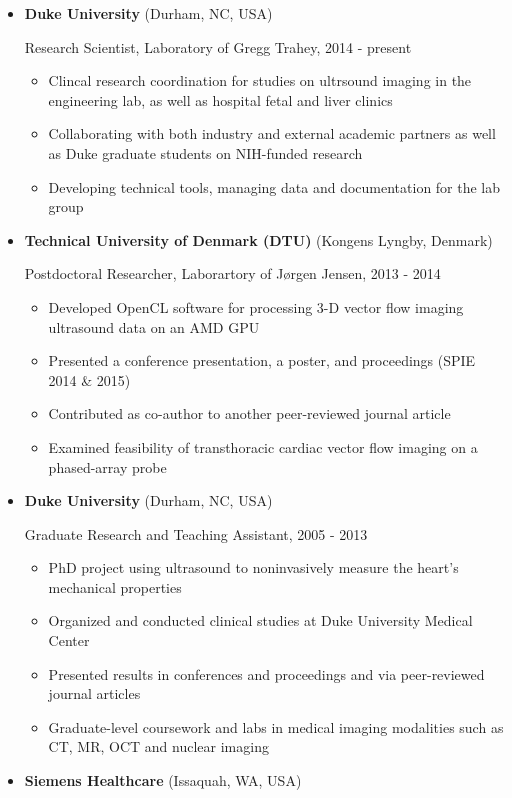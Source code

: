 \documentclass[
]{article}
\providecommand{\tightlist}{%
  \setlength{\itemsep}{0pt}\setlength{\parskip}{0pt}}
\begin{document}
\begin{itemize}
\item
  \textbf{Duke University} (Durham, NC, USA)

  Research Scientist, Laboratory of Gregg Trahey, 2014 - present

  \begin{itemize}
  \tightlist
  \item
    Clincal research coordination for studies on ultrsound imaging in
    the engineering lab, as well as hospital fetal and liver clinics
  \item
    Collaborating with both industry and external academic partners as
    well as Duke graduate students on NIH-funded research
  \item
    Developing technical tools, managing data and documentation for the
    lab group
  \end{itemize}
\item
  \textbf{Technical University of Denmark (DTU)} (Kongens Lyngby,
  Denmark)

  Postdoctoral Researcher, Laborartory of Jørgen Jensen, 2013 - 2014

  \begin{itemize}
  \tightlist
  \item
    Developed OpenCL software for processing 3-D vector flow imaging
    ultrasound data on an AMD GPU
  \item
    Presented a conference presentation, a poster, and proceedings (SPIE
    2014 \& 2015)
  \item
    Contributed as co-author to another peer-reviewed journal article
  \item
    Examined feasibility of transthoracic cardiac vector flow imaging on
    a phased-array probe
  \end{itemize}
\item
  \textbf{Duke University} (Durham, NC, USA)

  Graduate Research and Teaching Assistant, 2005 - 2013

  \begin{itemize}
  \tightlist
  \item
    PhD project using ultrasound to noninvasively measure the heart's
    mechanical properties
  \item
    Organized and conducted clinical studies at Duke University Medical
    Center
  \item
    Presented results in conferences and proceedings and via
    peer-reviewed journal articles
  \item
    Graduate-level coursework and labs in medical imaging modalities
    such as CT, MR, OCT and nuclear imaging
  \end{itemize}
\item
  \textbf{Siemens Healthcare} (Issaquah, WA, USA)


\end{itemize}
\end{document}
